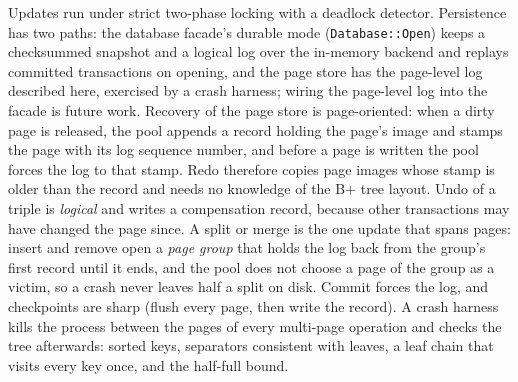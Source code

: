 Updates run under strict two-phase locking with a deadlock detector.
Persistence has two paths: the database facade's durable mode (\texttt{Database::Open})
keeps a checksummed snapshot and a logical log over the in-memory backend and replays
committed transactions on opening, and the page store has the page-level log described
here, exercised by a crash harness; wiring the page-level log into the facade is future
work.
Recovery of the page store is page-oriented: when a dirty page is released, the pool appends a
record holding the page's image and stamps the page with its log sequence
number, and before a page is written the pool forces the log to that stamp.
Redo therefore copies page images whose stamp is older than the record and
needs no knowledge of the B+ tree layout.
Undo of a triple is \emph{logical} and writes a compensation record, because
other transactions may have changed the page since.
A split or merge is the one update that spans pages: insert and remove open a
\emph{page group} that holds the log back from the group's first record
until it ends, and the pool does not choose a page of the group as a victim,
so a crash never leaves half a split on disk.
Commit forces the log, and checkpoints are sharp (flush every page, then
write the record).
A crash harness kills the process between the pages of every multi-page
operation and checks the tree afterwards: sorted keys, separators consistent
with leaves, a leaf chain that visits every key once, and the half-full
bound.
